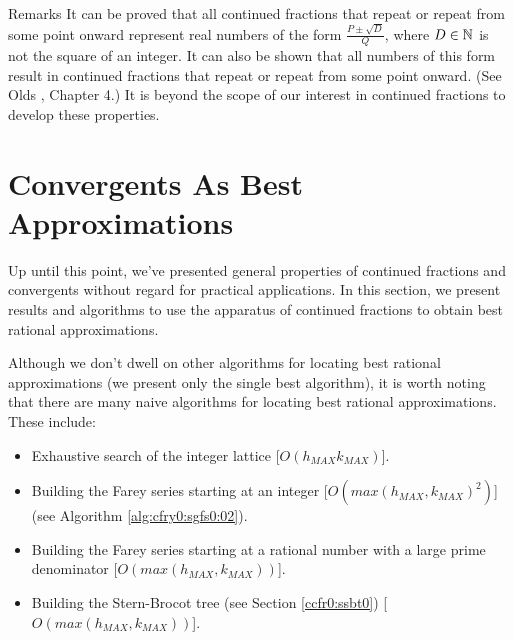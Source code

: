 \begin{vworkexampleparsection}{Remarks}
It can be proved that all continued fractions that repeat or repeat
from some point onward 
represent real numbers of the form $\frac{P \pm \sqrt{D}}{Q}$,
where $D \in {\mathbb{N}}$ is not the square of an integer.  
It can also be shown
that all numbers of this form result in continued fractions that
repeat or repeat from some point onward.  (See Olds 
\cite{bibref:b:OldsClassic}, Chapter 4.)  It is beyond the scope
of our interest in continued fractions to develop these properties.
\end{vworkexampleparsection}
\vworkexamplefooter{}


\section{Convergents As Best Approximations}

Up until this point, we've presented general properties of continued
fractions and convergents without regard for practical applications.
In this section, we present results and algorithms to use the 
apparatus of continued fractions to obtain best rational approximations.

Although we don't dwell on other algorithms for locating best 
rational approximations (we present only the single best
algorithm), it is worth noting that there are many naive algorithms
for locating best rational approximations.  These include:

\begin{itemize}

\item  Exhaustive search of the integer lattice
       [$O(h_{MAX} k_{MAX})$].

\item  Building the Farey series starting at an
       integer [$O(max(h_{MAX}, k_{MAX})^2)$]
	   (see Algorithm \ref{alg:cfry0:sgfs0:02}).

\item  Building the Farey series starting at a rational number with
       a large prime denominator [$O(max(h_{MAX}, k_{MAX}))$].

\item  Building the Stern-Brocot tree (see Section \ref{ccfr0:ssbt0})
       [$O(max(h_{MAX}, k_{MAX}))$].

\end{itemize}

